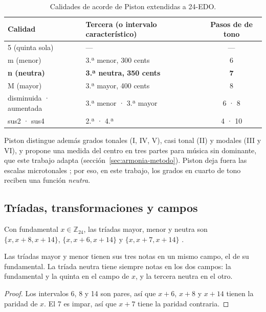 \begin{table}[ht]
  \centering
  \caption{Calidades de acorde de Piston extendidas a 24-EDO.}\label{tab:calidades}
  \begin{tabular}{llc}
    \toprule
    Calidad & Tercera (o intervalo característico) & Pasos de \cuarto{} de tono \\
    \midrule
    5 (quinta sola) & — & — \\
    m (menor) & 3.ª menor, 300 cents & 6 \\
    \textbf{n (neutra)} & \textbf{3.ª neutra, 350 cents} & \textbf{7} \\
    M (mayor) & 3.ª mayor, 400 cents & 8 \\
    disminuida · aumentada & 3.ª menor · 3.ª mayor & 6 · 8 \\
    sus2 · sus4 & 2.ª · 4.ª & 4 · 10 \\
    \bottomrule
  \end{tabular}
\end{table}

Piston distingue además grados tonales (I, IV, V), casi tonal (II) y modales (III y VI), y propone una medida del centro
en tres partes para música sin dominante, que este trabajo adapta (sección~\ref{sec:armonia-metodo}). Piston deja fuera
las escalas microtonales \citep[p.~474]{piston1987}; por eso, en este trabajo, los grados en cuarto de tono reciben una
función \emph{neutra}.

\subsection{Tríadas, transformaciones y campos}\label{sec:triadas-campos}

Con fundamental $x \in \mathbb{Z}_{24}$, las tríadas mayor, menor y neutra son $\{x, x+8, x+14\}$, $\{x, x+6, x+14\}$ y
$\{x, x+7, x+14\}$ \citep{flynn2025}.

\begin{proposicion}\label{prop:neutra}
Las tríadas mayor y menor tienen sus tres notas en un mismo campo, el de su fundamental. La tríada neutra tiene siempre
notas en los dos campos: la fundamental y la quinta en el campo de $x$, y la tercera neutra en el otro.
\end{proposicion}

\begin{proof}
Los intervalos 6, 8 y 14 son pares, así que $x+6$, $x+8$ y $x+14$ tienen la paridad de $x$. El 7 es impar, así que $x+7$
tiene la paridad contraria.
\end{proof}

